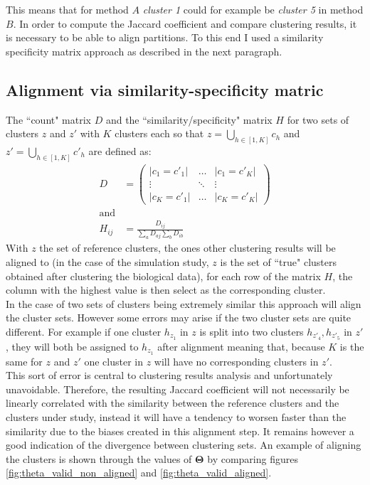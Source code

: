 This means that for method $A$ \emph{cluster 1} could for example be \emph{cluster 5} in method $B$. In order to compute the Jaccard coefficient and compare clustering results, it is necessary to be able to align partitions. To this end I used a similarity specificity matrix approach as described in the next paragraph.


	\subsection{Alignment via similarity-specificity matric}
The ``count" matrix $D$ and the ``similarity/specificity" matrix $H$ for two sets of clusters $z$ and $z'$ with $K$ clusters each so that $z = \bigcup_{h \in [1,K]} c_h $ and $z' = \bigcup_{h \in [1,K]} c'_h$ are defined as:
\begin{align*}
D &= \left( \begin{array} {ccc}
|c_1 = c'_1| & \ldots  & |c_1 = c'_K|\\
\vdots & \ddots & \vdots\\
|c_K = c'_1| & \ldots & |c_K = c'_K| \end{array} \right)\\
\text{and}\\
H_{ij} &= \frac{D_{ij}}{\sum_{a} D_{aj} \sum_{b} D_{ib}} 
\end{align*}
With $z$ the set of reference clusters, the ones other clustering results will be aligned to (in the case of the simulation study, $z$ is the set of ``true" clusters obtained after clustering the biological data), for each row of the matrix $H$, the column with the highest value is then select as the corresponding cluster.\\

In the case of two sets of clusters being extremely similar this approach will align the cluster sets. However some errors may arise if the two cluster sets are quite different. For example if one cluster $h_{z_1}$ in $z$ is split into two clusters $h_{z'_4},h_{z'_5}$ in $z'$, they will both be assigned to $h_{z_1}$ after alignment meaning that, because $K$ is the same for $z$ and $z'$ one cluster in $z$ will have no corresponding clusters in $z'$.\\

This sort of error is central to clustering results analysis and unfortunately unavoidable. Therefore, the resulting Jaccard coefficient will not necessarily be linearly correlated with the similarity between the reference clusters and the clusters under study, instead it will have a tendency to worsen faster than the similarity due to the biases created in this alignment step. It remains however a good indication of the divergence between clustering sets. An example of aligning the clusters is shown through the values of $\boldsymbol{\Theta}$ by comparing  figures \ref{fig:theta_valid_non_aligned} and \ref{fig:theta_valid_aligned}.\\

